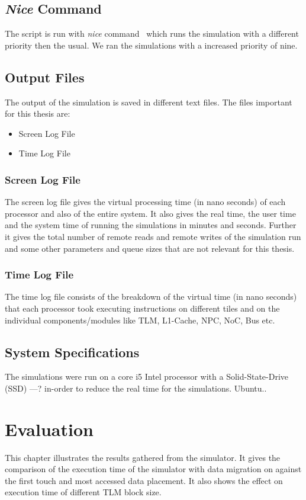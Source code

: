 \documentclass{listhesis}
\begin{document}
\section{\textit{Nice} Command}
The script is run with \textit{nice} command~\cite{nice} which runs the simulation with a different priority then the usual. We ran the simulations with a increased priority of nine.
\section{Output Files}
The output of the simulation is saved in different text files. The files important for this thesis are:
\begin{itemize}
\item Screen Log File
\item Time Log File
\end{itemize}
\subsection{Screen Log File}
The screen log file gives the virtual processing time (in nano seconds) of each processor and also of the entire system. It also gives the real time, the user time and the system time of running the simulations in minutes and seconds. Further it gives the total number of remote reads and remote writes of the simulation run and some other parameters and queue sizes that are not relevant for this thesis.\\
\subsection{Time Log File}
The time log file consists of the breakdown of the virtual time (in nano seconds) that each processor took executing instructions on different tiles and on the individual components/modules like TLM, L1-Cache, NPC, NoC, Bus etc.
\section{System Specifications}
The simulations were run on a core i5 Intel processor with a Solid-State-Drive (SSD) ---? in-order to reduce the real time for the simulations. Ubuntu..
\chapter{Evaluation}
This chapter illustrates the results gathered from the simulator. It gives the comparison of the execution time of the simulator with data migration on against the first touch and most accessed data placement. It also shows the effect on execution time of different TLM block size.
\end{document}
